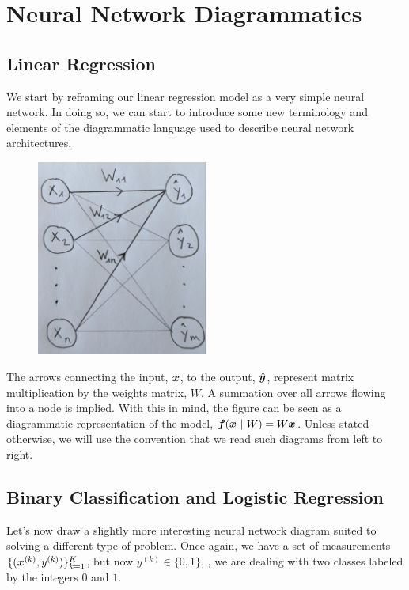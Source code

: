\section{Neural Network Diagrammatics}
\label{section:neural-network-diagrammatics}
%
%
\subsection{Linear Regression}
%
%
We start by reframing our linear regression model as a very simple neural network.
In doing so, we can start to introduce some new terminology and elements of the diagrammatic language used to describe neural network architectures.
%
\begin{figure}[H]
    \centering
    \includegraphics[width=0.5\textwidth]{../figures/chapter_01/nn_diagram_linear_regression.png}
\end{figure}
%

The arrows connecting the input, $\bm{x}$, to the output, $\hat{\bm{y}}$, represent matrix multiplication by the weights matrix, $W$.
A summation over all arrows flowing into a node is implied.
With this in mind, the figure can be seen as a diagrammatic representation of the model, $\bm{f}(\bm{x} ~|~ W) = W \bm{x}$.
Unless stated otherwise, we will use the convention that we read such diagrams from left to right.

%
%
\subsection{Binary Classification and Logistic Regression}
%
%
Let's now draw a slightly more interesting neural network diagram suited to solving a different type of problem.
Once again, we have a set of measurements $\{(\bm{x}^{(k)}, y^{(k)})\}_{k=1}^K$, but now $y^{(k)} \in \{0, 1\}$, \ie, we are dealing with two classes labeled by the integers $0$ and $1$.


